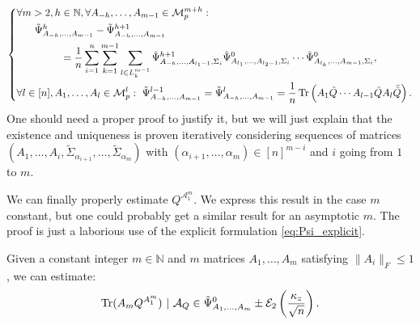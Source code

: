 \documentclass[a4papaer, titlepage]{book}
\begin{document}
\begin{align*}
  \left\{
    \begin{aligned}
    &\forall m >2, h \in \mathbb N, \forall A_{-h},\ldots, A_{m-1} \in \mathcal{M}_{p}^{m+h} :\\
    &\hspace{0.5cm} \ \tilde \Psi_{A_{-h},\ldots, A_{m-1}}^h - \tilde \Psi_{A_{-h},\ldots, A_{m-1}}^{h+1}\\
    &\hspace{1.5cm}= \frac{1}{n} \sum_{i=1}^n\sum_{k=1}^{m-1}\sum_{l\in L_k^{m-1}} \tilde \Psi^{h+1}_{A_{-h},\ldots, A_{l_1 - 1},\Sigma_i} \tilde \Psi^0_{A_{l_1},\ldots, A_{l_2 - 1},\Sigma_i}\cdots \tilde \Psi^0_{A_{l_k},\ldots, A_{m - 1},\Sigma_i},\\
    & \forall l \in[n], A_1,\ldots, A_l \in \mathcal{M}_{p}^l: \ \tilde \Psi^{l-1}_{A_{-h},\ldots, A_{m - 1}} = \tilde \Psi^l_{A_{-h},\ldots, A_{m - 1}}  = \frac{1}{n} \operatorname{Tr} \left( A_{1} \tilde Q  \cdots A_{l-1}\tilde QA_{l} \bar{\tilde Q} \right). 
    \end{aligned}\right.
  \end{align*}
One should need a proper proof to justify it, but we will just explain that the existence and uniqueness is proven iteratively considering sequences of matrices $(A_1,\ldots, A_i, \tilde \Sigma_{\alpha_{i+1}}, \ldots, \tilde \Sigma_{\alpha_m})$ with $(\alpha_{i+1}, \ldots, \alpha_m) \in [n]^{m-i}$ and $i$ going from $1$ to $m$.

We can finally properly estimate $Q^{\mathcal A_1^m}$. We express this result in the case $m$ constant, but one could probably get a similar result for an asymptotic $m$. The proof is just a laborious use of the explicit formulation \eqref{eq:Psi_explicit}.
\begin{proposition}\label{pro:estimation_finale_Qm}
  Given a constant integer $m \in \mathbb N$ and $m$ matrices $A_1,\ldots, A_m$ satisfying $\|A_i\|_F\leq 1$, we can estimate:
  \begin{align*}
    \operatorname{Tr}(A_m Q^{A_1^m}) \ | \ \mathcal A_Q \in \tilde \Psi^0_{A_1,\ldots, A_m} \pm \mathcal E_2 \left( \frac{\kappa_z}{\sqrt n} \right).
  \end{align*}
\end{proposition}


\end{document}
